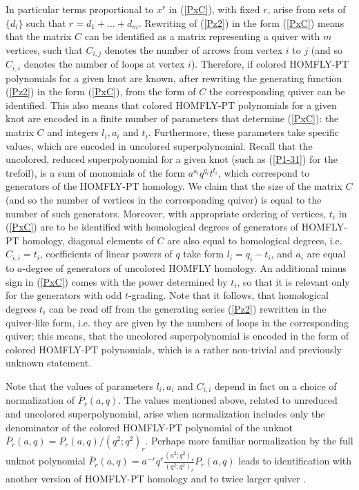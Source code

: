 \documentclass[
 reprint,
 amsmath,amssymb,
 aps,prl
]{revtex4-1}
\begin{document}
In particular terms proportional to $x^r$ in (\ref{PxC}), with fixed $r$, arise from sets of $\{d_i \}$ such that $r=d_1+\ldots +d_m$. Rewriting of (\ref{Pz2}) in the form (\ref{PxC})  means that the matrix $C$ can be identified as a matrix representing a quiver with $m$ vertices, such that $C_{i,j}$ denotes the number of arrows from vertex $i$ to $j$ (and so $C_{i,i}$ denotes the number of loops at vertex $i$). Therefore, if colored HOMFLY-PT polynomials for a given knot are known, after rewriting the generating function (\ref{Pz2}) in the form (\ref{PxC}), from the form of $C$ the corresponding quiver can be identified. This also means that colored HOMFLY-PT polynomials for a given knot are encoded in a finite number of parameters that determine (\ref{PxC}): the matrix $C$ and integers $l_i,a_i$ and $t_i$. Furthermore, these parameters take specific values, which are encoded in uncolored superpolynomial. Recall that the uncolored, reduced superpolynomial for a given knot (such as (\ref{P1-31}) for the trefoil), is a sum of monomials of the form $a^{a_i} q^{q_i} t^{t_i}$, which correspond to generators of the HOMFLY-PT homology. We claim that the size of the matrix $C$ (and so the number of vertices in the corresponding quiver) is equal to the number of such generators. Moreover, with appropriate ordering of vertices, $t_i$ in (\ref{PxC}) are to be identified with homological degrees of generators of HOMFLY-PT homology, diagonal elements of $C$ are also equal to homological degrees, i.e. $C_{i,i}=t_i$, coefficients of linear powers of $q$ take form $l_i=q_i-t_i$, and $a_i$ are equal to $a$-degree of generators of uncolored HOMFLY homology. An additional minus sign in (\ref{PxC}) comes with the power determined by $t_i$, so that it is relevant only for the generators with odd $t$-grading. Note that it follows, that homological degrees $t_i$ can be read off from the generating series (\ref{Pz2}) rewritten in the quiver-like form, i.e. they are given by the numbers of loops in the corresponding quiver; this means, that the uncolored superpolynomial is encoded in the form of colored HOMFLY-PT polynomials, which is a rather non-trivial and previously unknown statement. 

Note that the values of parameters $l_i, a_i$ and $C_{i,i}$ depend in fact on a choice of normalization of $\overline{P}_r(a,q)$. The values mentioned above, related to unreduced and uncolored superpolynomial, arise when normalization includes only the denominator of the colored HOMFLY-PT polynomial of the unknot $\overline{P}_r(a,q)=P_r(a,q) / (q^2;q^2)_r$. Perhaps more familiar normalization by the full unknot polynomial $\overline{P}_r(a,q)=a^{-r}q^r\frac{(a^2;q^2)_r}{(q^2;q^2)_r}P_r(a,q)$ leads to identification with another version of HOMFLY-PT homology and to twice larger quiver \cite{KRSS2}.
\end{document}

